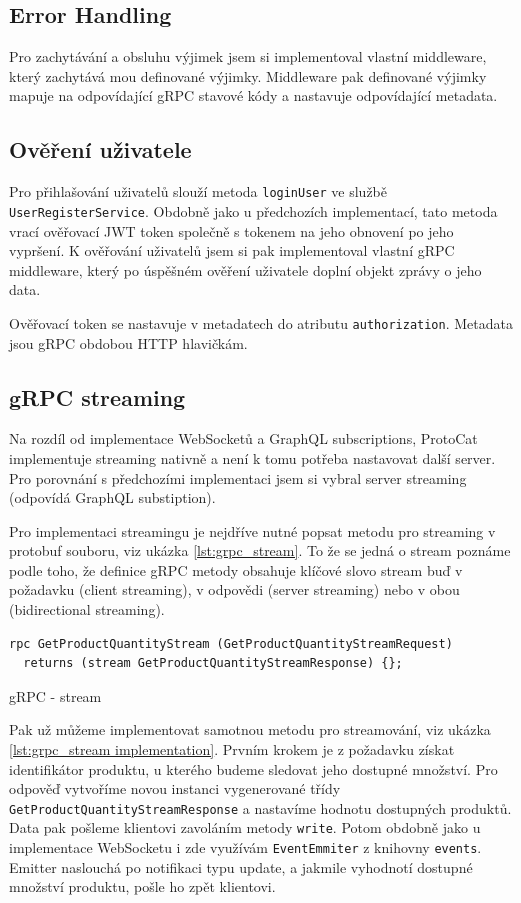 \documentclass[thesis=M,czech]{FITthesis}[2019/12/23]
\begin{document}
\subsection{Error Handling}
Pro zachytávání a obsluhu výjimek jsem si implementoval vlastní middleware, který zachytává mou definované výjimky. Middleware pak definované výjimky mapuje na odpovídající gRPC stavové kódy a nastavuje odpovídající metadata.

\subsection{Ověření uživatele}
Pro přihlašování uživatelů slouží metoda \texttt{loginUser} ve službě \texttt{UserRegisterService}. Obdobně jako u předchozích implementací, tato metoda vrací ověřovací JWT token společně s tokenem na jeho obnovení po jeho vypršení. K ověřování uživatelů jsem si pak implementoval vlastní gRPC middleware, který po úspěšném ověření uživatele doplní objekt zprávy o jeho data.

Ověřovací token se nastavuje v metadatech do atributu \texttt{authorization}. Metadata jsou gRPC obdobou HTTP hlavičkám.

\subsection{gRPC streaming}
Na rozdíl od implementace WebSocketů a GraphQL subscriptions, ProtoCat implementuje streaming nativně a není k tomu potřeba nastavovat další server. Pro porovnání s předchozími implementaci jsem si vybral server streaming (odpovídá GraphQL substiption).

Pro implementaci streamingu je nejdříve nutné popsat metodu pro streaming v protobuf souboru, viz ukázka \ref{lst:grpc_stream}. To že se jedná o stream poznáme podle toho, že definice gRPC metody obsahuje klíčové slovo stream buď v požadavku (client streaming), v odpovědi (server streaming) nebo v obou (bidirectional streaming).

\begin{listing}[H]
\begin{verbatim}
rpc GetProductQuantityStream (GetProductQuantityStreamRequest)
  returns (stream GetProductQuantityStreamResponse) {};
\end{verbatim}
\caption{gRPC - stream}
\label{lst:grpc_stream}
\end{listing}

Pak už můžeme implementovat samotnou metodu pro streamování, viz ukázka \ref{lst:grpc_stream implementation}. Prvním krokem je z požadavku získat identifikátor produktu, u kterého budeme sledovat jeho dostupné množství. Pro odpověď vytvoříme novou instanci vygenerované třídy \texttt{GetProductQuantityStreamResponse} a nastavíme hodnotu dostupných produktů. Data pak pošleme klientovi zavoláním metody \texttt{write}. Potom obdobně jako u implementace WebSocketu i zde využívám \texttt{EventEmmiter} z knihovny \texttt{events}. Emitter naslouchá po notifikaci typu update, a jakmile vyhodnotí dostupné množství produktu, pošle ho zpět klientovi.
\end{document}
